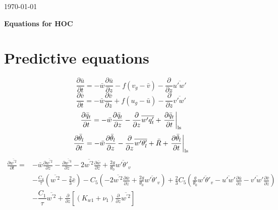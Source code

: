 \documentclass[11pt,fleqn]{article}
\newcommand{\ptlder}[2]{\frac{\partial #1}{\partial #2}}
\begin{document}
\begin{flushright} \today \end{flushright}

\vspace*{.1in}
\begin{center}  {\Large\bf Equations for HOC}  \end{center}
\vspace*{.1in}

\section{Predictive equations}

\begin{equation}
\label{eq_um}
\ptlder{\bar{u}}{t} 
= - \bar{w}\ptlder{\bar{u}}{z} 
  - f (v_g - \bar{v})
  - \ptlder{}{z}\overline{u'w'} 
\end{equation}
%
\begin{equation}
\label{eq_vm}
\ptlder{\bar{v}}{t} 
= - \bar{w}\ptlder{\bar{v}}{z} 
  + f (u_g - \bar{u})
  - \ptlder{}{z}\overline{v'w'} 
\end{equation}
%
\begin{equation}
\label{eq_qtm}
\ptlder{\bar{q}_t}{t}
= - \bar{w}\ptlder{\bar{q}_t}{z} 
  - \ptlder{}{z}\overline{w'q'_t} 
  + \left. \ptlder{\bar{q}_t}{t} \right|_{\rm ls}
\end{equation}
%
\begin{equation}
\label{eq_thlm}
\ptlder{\bar{\theta}_l}{t} 
= - \bar{w}\ptlder{\bar{\theta}_l}{z} 
  - \ptlder{}{z}\overline{w'\theta'_l} 
  + \bar{R}   
  + \left. \ptlder{\bar{\theta}_l}{t} \right|_{\rm ls}
\end{equation}
%
\begin{equation}
\label{eq_wp2}
\begin{split}
\ptlder{\overline{w^{'2}}}{t} 
=& - \bar{w}\ptlder{\overline{w^{'2}}}{z}	 
   - \ptlder{\overline{w^{'3}}}{z} 
   - 2\overline{w^{'2}}\ptlder{\bar{w}}{z}
   + \frac{2g}{\theta_0} \overline{w'\theta'_v} \\
 & - \frac{C_4}{\tau} \left( \overline{w^{'2}} -\frac{2}{3}\bar{e} \right)
   - C_5 
     \left(
       - 2\overline{w^{'2}}\ptlder{\bar{w}}{z}
       + \frac{2g}{\theta_0} \overline{w'\theta'_v}
     \right)
   + \frac{2}{3} C_5
     \left(
       \frac{g}{\theta_0} \overline{w'\theta'_v} 
       - \overline{u'w'}\ptlder{\bar{u}}{z} 
       - \overline{v'w'}\ptlder{\bar{v}}{z} 
     \right) \\
 & - \dfrac{C_1}{\tau} \overline{w^{'2}} 
   + \ptlder{}{z} \left[ \left( K_{w1} + \nu_1 \right)
                         \ptlder{}{z} \overline{w^{'2}} 
                  \right]
\end{split}
\end{equation}
\end{document}
